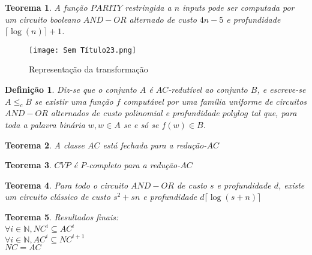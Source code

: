 \documentclass[10pt,a4paper]{report}
\newtheorem{definition}{Definição}
\newtheorem{theorem}{Teorema}
\begin{document}
\begin{theorem}
A função $PARITY$ restringida a $n$ inputs pode ser computada por um circuito booleano $AND-OR$ alternado de custo $4n - 5$ e profundidade $\lceil \log (n)\rceil + 1$.
\end{theorem}
\begin{figure}[H]
\centering
\texttt{[image: Sem Título23.png]}
\caption{Representação da transformação}
\end{figure}
\begin{definition} 
Diz-se que o conjunto $A$ é $AC$-redutível ao conjunto $B$, e escreve-se $A \leq_c B$ se existir uma função $f$ computável por uma família uniforme de circuitos $AND-OR$ alternados de custo polinomial e profundidade $polylog$ tal que, para toda a palavra binária $w, w \in A$ se e só se $f(w) \in B$.
\end{definition}
\begin{theorem}
A classe $AC$ está fechada para a redução-$AC$
\end{theorem}
\begin{theorem}
$CVP$ é $P$-completo para a redução-$AC$
\end{theorem}
\begin{theorem}
Para todo o circuito $AND-OR$ de custo $s$ e profundidade $d$, existe um circuito clássico de custo $s^2 +sn$ e profundidade $d\lceil \log (s + n)\rceil$
\end{theorem}
\begin{theorem}Resultados finais:\\
$\forall i \in \mathbb{N}, NC^i \subseteq AC^i$\\
$\forall i \in \mathbb{N}, AC^i \subseteq NC^{i+1}$\\
$NC = AC$
\end{theorem}
\end{document}
